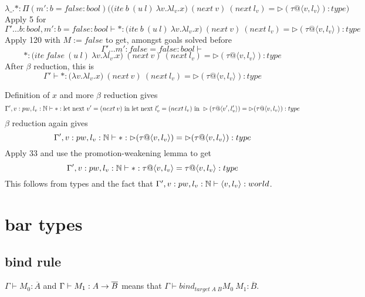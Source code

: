 \message{ !name(paper.tex)}\documentclass{article}
\begin{document}
\begin{itemize}
\begin{itemize}
\begin{itemize}
\begin{itemize}
\[  \lambda \_.* :\Pi(m' : b = false : bool)\Big(\big( ite \: b \: (u \: l) \: \lambda v. \lambda l_v. x \big) \:  (next \:v) \: (next \: l_v) = \rhd (\tau @ \langle v, l_v \rangle) : type \Big)
  \]
  Apply 5 for 
   \[\Gamma' \dots b: bool, m' : b = false : bool \vdash
* :\big( ite \: b \: (u \: l) \: \lambda v. \lambda l_v. x \big) \:  (next \:v) \: (next \: l_v) = \rhd (\tau @ \langle v, l_v \rangle) : type
  \]
  Apply 120 with $M:= false$ to get, amongst goals solved before 
     \[\Gamma' \dots m' : false = false : bool \vdash\]
\[* :\big( ite \: false \: (u \: l) \: \lambda v. \lambda l_v. x \big) \:  (next \:v) \: (next \: l_v) = \rhd (\tau @ \langle v, l_v \rangle) : type
  \]
  After $\beta$ reduction, this is 
  \[\Gamma'  \vdash
* : \big( \lambda v. \lambda l_v. x \big) \:  (next \:v) \: (next \: l_v) = \rhd (\tau @ \langle v, l_v \rangle) : type
  \]
     \end{itemize}

Definition of $x$ and more $\beta$ reduction gives
\[\Gamma', v: pw, l_v: \mathbb{N} \vdash   *
:  \text{let next }v' = (next \: v) \text{ in let next } l_v' = (next \: l_v) \text{ in } \rhd(\tau @ \langle v', l_v' \rangle)
= \rhd (\tau @ \langle v, l_v \rangle) : type
\]
$\beta$ reduction again gives 
\[\Gamma', v: pw, l_v: \mathbb{N} \vdash   *
:  \rhd(\tau @ \langle v, l_v \rangle)
= \rhd (\tau @ \langle v, l_v \rangle) : type
\]
Apply 33 and use the promotion-weakening lemma to get 
\[\Gamma', v: pw, l_v: \mathbb{N} \vdash   *
:  \tau @ \langle v, l_v \rangle
= \tau @ \langle v, l_v \rangle : type
\]
This follows from types and the fact that $\Gamma', v: pw, l_v: \mathbb{N} \vdash \langle v, l_v \rangle : world$.
\end{itemize}


\end{itemize}
\end{itemize}





 

\section*{bar types}

\subsection*{bind rule }
$\Gamma \vdash M_0 : \overline{A}$ and $\Gamma \vdash M_1 : A \rightarrow \overline{B}$ means that $\Gamma \vdash bind_{target\; A \; B} M_0 \: M_1 : \overline{B}$. 
\end{document}

